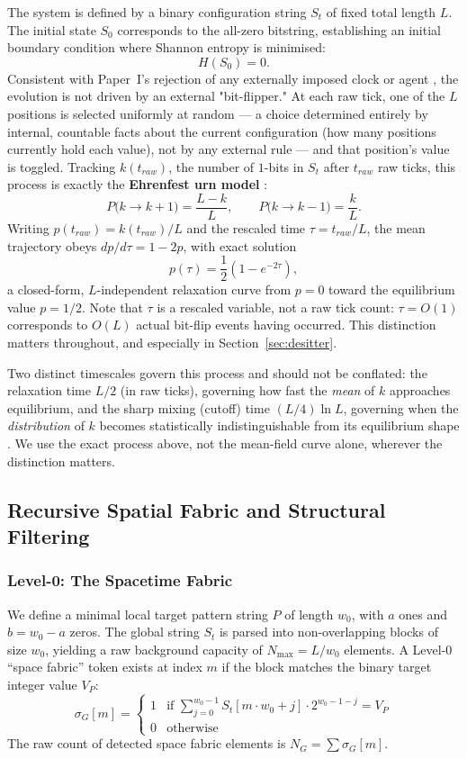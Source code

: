 \documentclass[11pt]{article}
\begin{document}
The system is defined by a binary configuration string $S_t$ of fixed total length $L$.
The initial state $S_0$ corresponds to the all-zero bitstring, establishing an initial boundary condition
where Shannon entropy is minimised:
\[
H(S_0) = 0.
\]
Consistent with Paper~I's rejection of any externally imposed clock or agent \cite{meskanen2001}, the
evolution is not driven by an external "bit-flipper." At each raw tick, one of the $L$ positions is selected
uniformly at random --- a choice determined entirely by internal, countable facts about the current
configuration (how many positions currently hold each value), not by any external rule --- and that
position's value is toggled. Tracking $k(t_{raw})$, the number of $1$-bits in $S_t$ after $t_{raw}$
raw ticks, this process is exactly the \textbf{Ehrenfest urn model} \cite{ehrenfest1907}:
\[
P\bigl(k \to k+1\bigr) = \frac{L-k}{L}, \qquad P\bigl(k \to k-1\bigr) = \frac{k}{L}.
\]
Writing $p(t_{raw}) = k(t_{raw})/L$ and the rescaled time $\tau = t_{raw}/L$, the mean
trajectory obeys $dp/d\tau = 1-2p$, with exact solution
\[
p(\tau) = \frac12\left(1-e^{-2\tau}\right),
\]
a closed-form, $L$-independent relaxation curve from $p=0$ toward the equilibrium value $p=1/2$. Note that
$\tau$ is a rescaled variable, not a raw tick count: $\tau=O(1)$ corresponds to $O(L)$ actual bit-flip events
having occurred. This distinction matters throughout, and especially in Section~\ref{sec:desitter}.

Two distinct timescales govern this process and should not be conflated: the relaxation time $L/2$ (in raw
ticks), governing how fast the \emph{mean} of $k$ approaches equilibrium, and the sharp mixing (cutoff) time
$(L/4)\ln L$, governing when the \emph{distribution} of $k$ becomes statistically indistinguishable from its
equilibrium shape \cite{diaconis1990hypercube}. We use the exact process above, not the mean-field curve
alone, wherever the distinction matters.

\subsection{Recursive Spatial Fabric and Structural Filtering}

\subsubsection*{Level-0: The Spacetime Fabric}

We define a minimal local target pattern string $P$ of length $w_0$, with $a$ ones and $b = w_0 - a$ zeros.
The global string $S_t$ is parsed into non-overlapping blocks of size $w_0$,
yielding a raw background capacity of $N_{\max} = L / w_0$ elements. A Level-0 ``space fabric'' token exists at
index $m$ if the block matches the binary target integer value $V_P$:
\[
\sigma_G[m] = \begin{cases} 1 & \text{if } \sum_{j=0}^{w_0-1} S_t[m \cdot w_0 + j] \cdot 2^{w_0 - 1 - j} = V_P \\ 0 & \text{otherwise} \end{cases}
\]
The raw count of detected space fabric elements is $N_G = \sum \sigma_G[m]$.
\end{document}
